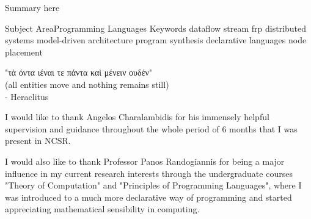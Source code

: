 \documentclass{dithesis}
\begin{document}




\maketitle

\begin{thesisabstract}[Abstract]
Summary here

\thesiskeywords
{Subject Area}{Programming Languages}
{Keywords}
	{dataflow}
	{stream}
	{frp}
	{distributed systems}
	{model-driven architecture}
	{program synthesis}
	{declarative languages}
	{node placement}
\end{thesisabstract}

\begin{thesisdedication}
"τὰ όντα ιέναι τε πάντα καὶ μένειν ουδέν" \\
(all entities move and nothing remains still) \\
- Heraclitus
\end{thesisdedication}

\begin{thesisacknowledgments}[Acknowledgements]

I would like to thank Angelos Charalambidis for his immensely helpful supervision and guidance throughout the whole period of 6 months that I was present in NCSR. 

I would also like to thank Professor Panos Randogiannis for being a major influence in my current research interests through the undergraduate courses "Theory of Computation" and "Principles of Programming Languages", where I was introduced to a much more declarative way of programming and started appreciating mathematical sensibility in computing.

\end{thesisacknowledgments}

\tableofcontents
\listoffigures
\end{document}
